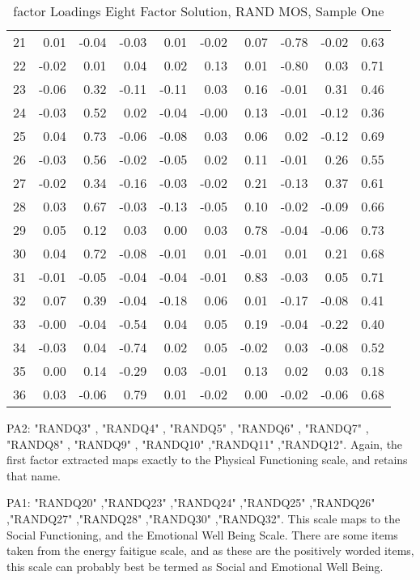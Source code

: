 \documentclass{article}
\begin{document}
\begin{table}[ht]
\begin{tabular}{rrrrrrrrrr}
  21 & 0.01 & -0.04 & -0.03 & 0.01 & -0.02 & 0.07 & -0.78 & -0.02 & 0.63 \\ 
  22 & -0.02 & 0.01 & 0.04 & 0.02 & 0.13 & 0.01 & -0.80 & 0.03 & 0.71 \\ 
  23 & -0.06 & 0.32 & -0.11 & -0.11 & 0.03 & 0.16 & -0.01 & 0.31 & 0.46 \\ 
  24 & -0.03 & 0.52 & 0.02 & -0.04 & -0.00 & 0.13 & -0.01 & -0.12 & 0.36 \\ 
  25 & 0.04 & 0.73 & -0.06 & -0.08 & 0.03 & 0.06 & 0.02 & -0.12 & 0.69 \\ 
  26 & -0.03 & 0.56 & -0.02 & -0.05 & 0.02 & 0.11 & -0.01 & 0.26 & 0.55 \\ 
  27 & -0.02 & 0.34 & -0.16 & -0.03 & -0.02 & 0.21 & -0.13 & 0.37 & 0.61 \\ 
  28 & 0.03 & 0.67 & -0.03 & -0.13 & -0.05 & 0.10 & -0.02 & -0.09 & 0.66 \\ 
  29 & 0.05 & 0.12 & 0.03 & 0.00 & 0.03 & 0.78 & -0.04 & -0.06 & 0.73 \\ 
  30 & 0.04 & 0.72 & -0.08 & -0.01 & 0.01 & -0.01 & 0.01 & 0.21 & 0.68 \\ 
  31 & -0.01 & -0.05 & -0.04 & -0.04 & -0.01 & 0.83 & -0.03 & 0.05 & 0.71 \\ 
  32 & 0.07 & 0.39 & -0.04 & -0.18 & 0.06 & 0.01 & -0.17 & -0.08 & 0.41 \\ 
  33 & -0.00 & -0.04 & -0.54 & 0.04 & 0.05 & 0.19 & -0.04 & -0.22 & 0.40 \\ 
  34 & -0.03 & 0.04 & -0.74 & 0.02 & 0.05 & -0.02 & 0.03 & -0.08 & 0.52 \\ 
  35 & 0.00 & 0.14 & -0.29 & 0.03 & -0.01 & 0.13 & 0.02 & 0.03 & 0.18 \\ 
  36 & 0.03 & -0.06 & 0.79 & 0.01 & -0.02 & 0.00 & -0.02 & -0.06 & 0.68 \\ 
   \hline
\end{tabular}
\caption{factor Loadings Eight Factor Solution, RAND MOS, Sample One} 
\label{tab:tcq1rand8fact}
\end{table}
PA2: "RANDQ3" , "RANDQ4" , "RANDQ5" , "RANDQ6" , "RANDQ7" , "RANDQ8" , "RANDQ9" , "RANDQ10" ,"RANDQ11" ,"RANDQ12". Again, the first factor extracted maps exactly to the Physical Functioning scale, and retains that name. 

PA1: "RANDQ20" ,"RANDQ23" ,"RANDQ24" ,"RANDQ25" ,"RANDQ26" ,"RANDQ27" ,"RANDQ28" ,"RANDQ30" ,"RANDQ32". This scale maps to the Social Functioning, and the Emotional Well Being Scale. There are some items taken from the energy faitigue scale, and as these are the positively worded items, this scale can probably best be termed as Social and Emotional Well Being. 
\end{document}
